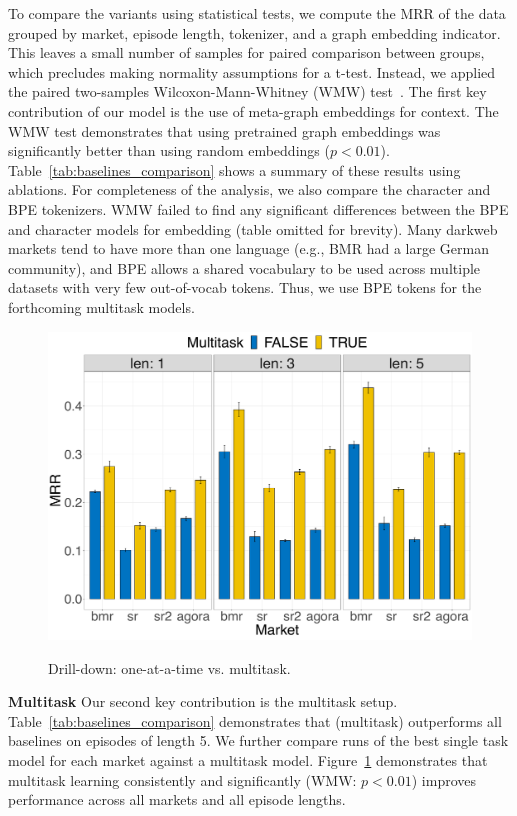 To compare the variants using statistical tests, we compute the MRR of the data grouped by market, episode length, tokenizer, and a graph embedding indicator.
This leaves a small number of samples for paired comparison between groups, which precludes making normality assumptions for a t-test. 
Instead, we applied the paired two-samples Wilcoxon-Mann-Whitney (WMW) test~\cite{mann1947test}.
The first key contribution of our model is the use of meta-graph embeddings for context. 
The WMW test demonstrates that using pretrained graph embeddings was significantly better than using random embeddings ($p < 0.01$). 
Table~\ref{tab:baselines_comparison} shows a summary of these results using ablations.
For completeness of the analysis, we also compare the character and BPE tokenizers.
WMW failed to find any significant differences between the BPE and character models for embedding (table omitted for brevity). 
Many darkweb markets tend to have more than one language (e.g., BMR had a large German community), and BPE  allows a shared vocabulary to be used across multiple datasets with very few out-of-vocab tokens. 
Thus, we use BPE tokens for the forthcoming multitask models.
\begin{figure}[!htbp]
    \centering
    \includegraphics[width=0.8\linewidth,alt={Bar chart showing drill-down: one-at-a-time vs. multitask.}]{sysml/plots/multitask.png}
    \caption{Drill-down: one-at-a-time vs. multitask.}
    \label{fig:multitask_results}
\end{figure} 

\noindent \textbf{Multitask} Our second key contribution is the multitask setup.
Table~\ref{tab:baselines_comparison} demonstrates that \SYSMLmethodname{} (multitask) outperforms all baselines on episodes of length 5. We further compare runs of the best single task model for each market against a multitask model. %
Figure~\ref{fig:multitask_results} demonstrates that multitask learning  consistently and significantly (WMW: $p < 0.01$) improves performance across all markets and all episode lengths. 




